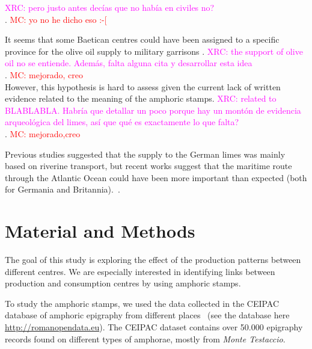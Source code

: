 \documentclass[review]{elsarticle}
\newcommand{\memo}[2]{\textcolor{#1}{#2}}
\newcommand{\maria}[1]{\memo{red}{MC: #1\\}}
\newcommand{\xavi}[1]{\memo{magenta}{XRC: #1\\}}
\begin{document}
\xavi{pero justo antes decías que no había en civiles no?}. 
\maria{yo no he dicho eso :-[}


It seems that some Baetican centres could have been assigned to a specific province for the olive oil supply to military garrisons \citep[125]{remesal_concierto}. 
\xavi{the support of olive oil no se entiende. Además, falta alguna cita y desarrollar esta idea}. 
\maria{mejorado, creo}
However, this hypothesis is hard to assess given the current lack of written evidence related to the meaning of the amphoric stamps. 
\xavi{related to BLABLABLA. Habría que detallar un poco porque hay un montón de evidencia arqueológica del limes, así que qué es exactamente lo que falta?}. 
\maria{mejorado,creo}

Previous studies suggested that the supply to the German limes was mainly based on riverine transport, but recent works suggest that the maritime route through the Atlantic Ocean could have been more important than expected (both for Germania and Britannia).~\citep{remesal_germn_2010,rubio-campillo_ecology_2018}.



\section{Material and Methods}


The goal of this study is exploring the effect of the production patterns between different centres. We are especially interested in identifying links between production and consumption centres by using amphoric stamps. 


To study the amphoric stamps, we used the data collected in the CEIPAC database of amphoric epigraphy from different places~\citep{remesal_centro_2015} (see the database here \url{http://romanopendata.eu}). The CEIPAC dataset contains over 50.000 epigraphy records found on different types of amphorae, mostly from \textit{Monte Testaccio}. 

\end{document}
